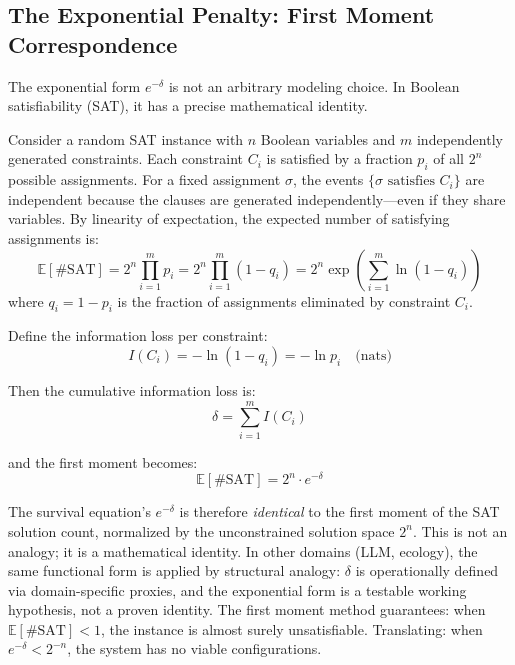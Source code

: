\documentclass[11pt,a4paper]{article}
\begin{document}
\subsection{The Exponential Penalty: First Moment Correspondence}
\label{sec:first-moment}

The exponential form $e^{-\delta}$ is not an arbitrary modeling choice. In Boolean satisfiability (SAT), it has a precise mathematical identity.

Consider a random SAT instance with $n$ Boolean variables and $m$ independently generated constraints. Each constraint $C_i$ is satisfied by a fraction $p_i$ of all $2^n$ possible assignments. For a fixed assignment $\sigma$, the events $\{\sigma \text{ satisfies } C_i\}$ are independent because the clauses are generated independently---even if they share variables. By linearity of expectation, the expected number of satisfying assignments is:
\begin{equation}
\mathbb{E}[\#\text{SAT}] = 2^n \prod_{i=1}^{m} p_i = 2^n \prod_{i=1}^{m} (1 - q_i) = 2^n \exp\!\left(\sum_{i=1}^{m} \ln(1 - q_i)\right)
\label{eq:first-moment}
\end{equation}
where $q_i = 1 - p_i$ is the fraction of assignments eliminated by constraint $C_i$.

Define the information loss per constraint:
\begin{equation}
I(C_i) = -\ln(1 - q_i) = -\ln p_i \quad \text{(nats)}
\label{eq:info-loss}
\end{equation}

Then the cumulative information loss is:
\begin{equation}
\delta = \sum_{i=1}^{m} I(C_i)
\label{eq:delta-def}
\end{equation}

and the first moment becomes:
\begin{equation}
\mathbb{E}[\#\text{SAT}] = 2^n \cdot e^{-\delta}
\label{eq:first-moment-exp}
\end{equation}

The survival equation's $e^{-\delta}$ is therefore \emph{identical} to the first moment of the SAT solution count, normalized by the unconstrained solution space $2^n$. This is not an analogy; it is a mathematical identity. In other domains (LLM, ecology), the same functional form is applied by structural analogy: $\delta$ is operationally defined via domain-specific proxies, and the exponential form is a testable working hypothesis, not a proven identity. The first moment method \citep{alon2016} guarantees: when $\mathbb{E}[\#\text{SAT}] < 1$, the instance is almost surely unsatisfiable. Translating: when $e^{-\delta} < 2^{-n}$, the system has no viable configurations.
\end{document}
